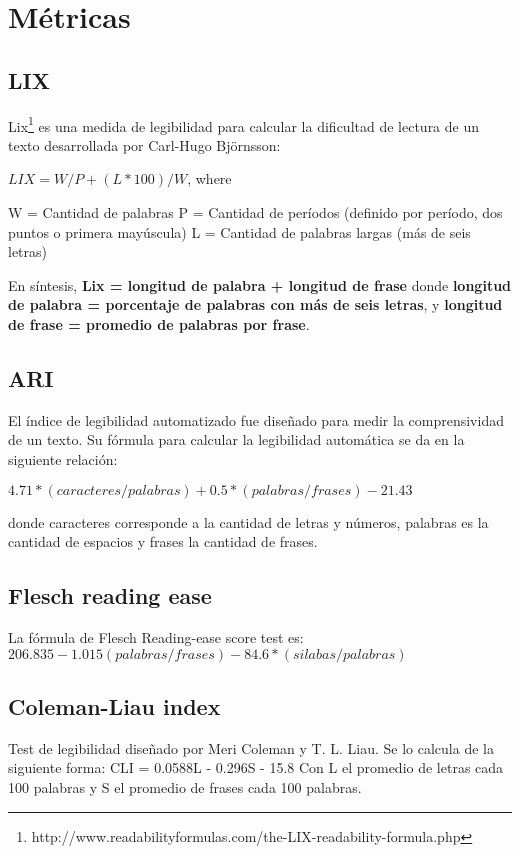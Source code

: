 \documentclass[12pt,journal,compsoc]{IEEEtran}
\begin{document}
\section{Métricas}

\subsection{LIX}

Lix\footnote{http://www.readabilityformulas.com/the-LIX-readability-formula.php} es una medida de legibilidad para calcular la dificultad de lectura de un texto desarrollada por Carl-Hugo Björnsson:

$LIX = W/P + (L * 100)/W$, where

W = Cantidad de palabras 
P = Cantidad de períodos (definido por período, dos puntos o primera mayúscula)
L = Cantidad de palabras largas (más de seis letras)

En síntesis, \textbf{Lix = longitud de palabra + longitud de frase} donde \textbf{longitud de palabra = porcentaje de palabras con más de seis letras}, y \textbf{longitud de frase = promedio de palabras por frase}.


\subsection{ARI}
El índice de legibilidad automatizado fue diseñado para medir la comprensividad de un texto. Su fórmula para calcular la legibilidad automática se da en la siguiente relación:

$4.71 * (caracteres/palabras)+0.5*(palabras/frases) - 21.43$

donde caracteres corresponde a la cantidad de letras y números, palabras es la cantidad de espacios y frases la cantidad de frases.

\subsection{Flesch reading ease}

La fórmula de Flesch Reading-ease score test es:
$206.835 - 1.015(palabras/frases) - 84.6*(silabas/palabras)$

\subsection{Coleman-Liau index}
Test de legibilidad diseñado por Meri Coleman y T. L. Liau. Se lo calcula de la siguiente forma: CLI = 0.0588L - 0.296S - 15.8
Con L el promedio de letras cada 100 palabras y S el promedio de frases cada 100 palabras.
\end{document}
